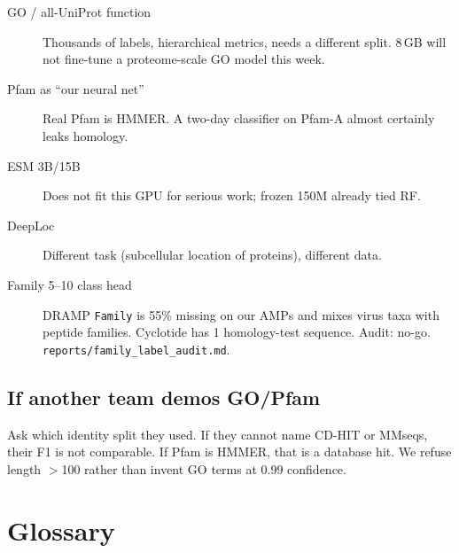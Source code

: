 \documentclass[11pt,a4paper]{report}
\begin{document}
\begin{description}
\item[GO / all-UniProt function] Thousands of labels, hierarchical metrics, needs a different split. 8\,GB will not fine-tune a proteome-scale GO model this week.
\item[Pfam as ``our neural net''] Real Pfam is HMMER. A two-day classifier on Pfam-A almost certainly leaks homology.
\item[ESM 3B/15B] Does not fit this GPU for serious work; frozen 150M already tied RF.
\item[DeepLoc] Different task (subcellular location of proteins), different data.
\item[Family 5--10 class head] DRAMP \texttt{Family} is 55\% missing on our AMPs and mixes virus taxa with peptide families. Cyclotide has 1 homology-test sequence. Audit: no-go. \texttt{reports/family\_label\_audit.md}.
\end{description}

\section{If another team demos GO/Pfam}

Ask which identity split they used. If they cannot name CD-HIT or MMseqs, their F1 is not comparable. If Pfam is HMMER, that is a database hit. We refuse length $>$100 rather than invent GO terms at 0.99 confidence.

\chapter{Glossary}
\label{ch:gloss}
\end{document}

